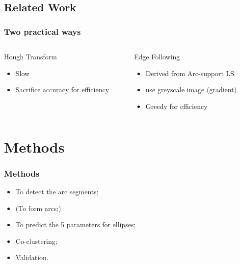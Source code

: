 \documentclass[aspectratio=169]{beamer}
\begin{document}
    \subsection{Related Work}
    \begin{frame}
        \frametitle{Two practical ways}
        
        

        \begin{columns}
            \begin{column}{.5\linewidth}
                Hough Transform
                \begin{itemize}
                    \item Slow
                    \item Sacrifice accuracy for efficiency
                \end{itemize}
            \end{column}
            \begin{column}{.5\linewidth}
                Edge Following
                \begin{itemize}
                    \item Derived from Arc-support LS 
                    \item use greyscale image (gradient)
                    \item Greedy for efficiency
                \end{itemize}
            \end{column}
        \end{columns}
        
    \end{frame}
    \section{Methods}
    \begin{frame}
        \frametitle{Methods}
    
        \begin{itemize}
            \item To detect the arc segments;
            \item (To form arcs;)
            \item To predict the 5 parameters for ellipses;
            \item Co-clustering;
            \item Validation.
        \end{itemize}
    
    \end{frame}
\end{document}
